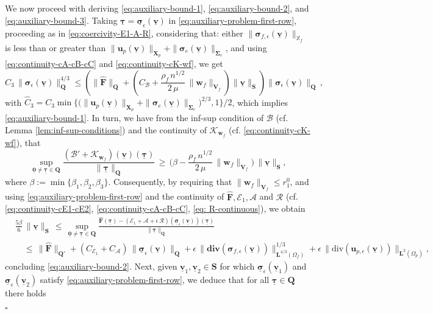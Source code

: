 \documentclass[11pt]{article}
\numberwithin{equation}{section}
\newcommand{\bsi}{{\boldsymbol\sigma}}
\newcommand{\bSigma}{{\boldsymbol\Sigma}}
\newcommand{\btau}{{\boldsymbol\tau}}
\newcommand{\ubsi}{\underline{\bsi}}
\newcommand{\ubtau}{\underline{\btau}}
\newcommand{\ubv}{\underline{\bv}}
\newcommand{\bv}{{\mathbf{v}}}
\newcommand{\bw}{{\mathbf{w}}}
\newcommand{\bu}{\mathbf{u}}
\newcommand{\0}{{\mathbf{0}}}
\def\bF{\mathbf{F}}
\def\bX{\mathbf{X}}
\def\bV{\mathbf{V}}
\def\bQ{\mathbf{Q}}
\def\bS{\mathbf{S}}
\newcommand{\bL}{\mathbf{L}}
\newcommand\bbX{\mathbb{X}}
\newcommand{\cA}{\mathcal{A}}
\newcommand{\cB}{\mathcal{B}}
\newcommand{\cE}{\mathcal{E}}
\newcommand{\cK}{\mathcal{K}}
\newcommand{\cR}{\mathcal{R}}
\def\bdiv{\mathbf{div}}
\def\div{\mathrm{div}}
\def\wh{\widehat}
\newenvironment{proof}{\noindent{\it Proof.}}{\hfill$\square$}
\numberwithin{equation}{section}
\begin{document}
\begin{proof}
We now proceed with deriving \eqref{eq:auxiliary-bound-1}, \eqref{eq:auxiliary-bound-2}, and \eqref{eq:auxiliary-bound-3}.
Taking $\ubtau=\ubsi_\epsilon(\ubv)$ in \eqref{eq:auxiliary-problem-first-row}, proceeding as in \eqref{eq:coercivity-E1-A-R}, considering that: either $\|\bsi_{f,\epsilon}(\ubv)\|_{\bbX_f}$ is less than or greater than $\|\bu_p(\ubv)\|_{\bX_p} 
+ \|\bsi_e(\ubv)\|_{\bSigma_e}$, and using \eqref{eq:continuity-cA-cB-cC} and \eqref{eq:continuity-cK-wf}, we get
\begin{equation*}
\wh{C}_3\,\|\bsi_{\epsilon}(\ubv)\|^{4/3}_{\bQ} 
\leq \left(\|\wh{\bF}\|_{\bQ} + \left(C_{\cB} + \frac{\rho_f\,n^{1/2}}{2\,\mu}\,\|\bw_f\|_{\bV_f}\right)\|\ubv\|_{\bS}\right) \|\bsi_{\epsilon}(\ubv)\|_{\bQ}\,,
\end{equation*}
with $\wh{C}_3=C_3\min\big\{ \big(\|\bu_p(\ubv)\|_{\bX_p} 
+ \|\bsi_e(\ubv)\|_{\bSigma_e}\big)^{2/3},1 \big\}/2$,
which implies \eqref{eq:auxiliary-bound-1}.
In turn, we have from the inf-sup condition of $\cB$ (cf. Lemma \ref{lem:inf-sup-conditions}) and the continuity of $\cK_{\bw_f}$ (cf. \eqref{eq:continuity-cK-wf}), that
\begin{equation*}%
\sup_{\underline{\0} \neq\ubtau\in \bQ} \frac{(\cB' + \cK_{\bw_f})(\ubv)(\ubtau)}{\|\ubtau\|_\bQ} 
\,\geq\, \Big( \beta - \frac{\rho_f\,n^{1/2}}{2\,\mu}\,\|\bw_f\|_{\bV_f} \Big)\,\|\ubv\|_\bS,
\end{equation*}
where $\beta := \min\big\{\beta_1, \beta_2, \beta_3\big\}$.
Consequently, by requiring that $\|\bw_f\|_{\bV_f} \leq r_1^0$,
and using \eqref{eq:auxiliary-problem-first-row} and the continuity of $\wh{\bF}, \cE_1, \cA$ and $\cR$ (cf. \eqref{eq:continuity-cE1-cE2}, \eqref{eq:continuity-cA-cB-cC}, \eqref{eq: R-continuous}), we obtain
\begin{align}
& \frac{5\beta}{6}\,\|\ubv\|_\bS 
\,\leq\, \sup_{\underline{\0} \neq\ubtau\in \bQ} \frac{\wh{\bF}(\ubtau) - (\cE_1 + \cA + \epsilon\,\cR)(\ubsi_\epsilon(\ubv))(\ubtau)}{\|\ubtau\|_\bQ} \nonumber\\ 
&\quad \leq \, \|\wh{\bF}\|_{\bQ'} + (C_{\cE_1} + C_{\cA})\,\|\ubsi_\epsilon(\ubv)\|_\bQ + \epsilon\,\|\bdiv(\bsi_{f,\epsilon}(\ubv))\|^{1/3}_{\bL^{4/3}(\Omega_f)}+\epsilon\, \|\div(\bu_{p,\epsilon}(\ubv))\|_{\bL^2(\Omega_p)},\label{eq:inf-sup-B-1}
\end{align}
concluding \eqref{eq:auxiliary-bound-2}.
Next, given $\ubv_1, \ubv_2\in \bS$ for which $\ubsi_\epsilon(\ubv_1)$ and $\ubsi_\epsilon(\ubv_2)$ satisfy \eqref{eq:auxiliary-problem-first-row}, we deduce that
for all $\ubtau \in \bQ$ there holds

\end{proof}
\end{document}
